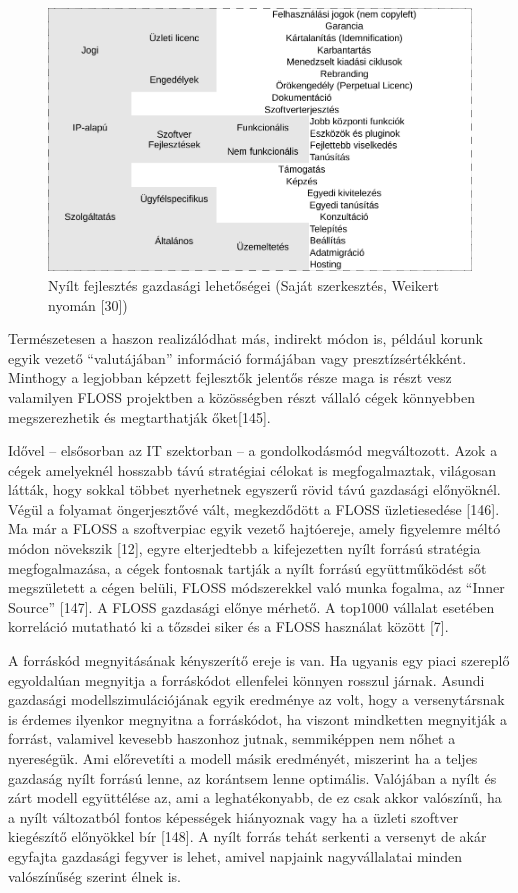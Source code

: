 \documentclass[12pt,magyar,a4paper,oneside]{scrreprt}
\begin{document}
\begin{figure}
\hypertarget{fig:uxdczletiModell}{%
\centering
\includegraphics{ábrák/FLOSS-üzleti-lehetőségek.pdf}
\caption{Nyílt fejlesztés gazdasági lehetőségei (Saját szerkesztés,
Weikert nyomán {[}30{]})}\label{fig:uxdczletiModell}
}
\end{figure}

Természetesen a haszon realizálódhat más, indirekt módon is, például
korunk egyik vezető ``valutájában'' információ formájában vagy
presztízsértékként. Minthogy a legjobban képzett fejlesztők jelentős
része maga is részt vesz valamilyen FLOSS projektben a közösségben részt
vállaló cégek könnyebben megszerezhetik és megtarthatják őket{[}145{]}.

Idővel -- elsősorban az IT szektorban -- a gondolkodásmód megváltozott.
Azok a cégek amelyeknél hosszabb távú stratégiai célokat is
megfogalmaztak, világosan látták, hogy sokkal többet nyerhetnek egyszerű
rövid távú gazdasági előnyöknél. Végül a folyamat öngerjesztővé vált,
megkezdődött a FLOSS üzletiesedése {[}146{]}. Ma már a FLOSS a
szoftverpiac egyik vezető hajtóereje, amely figyelemre méltó módon
növekszik {[}12{]}, egyre elterjedtebb a kifejezetten nyílt forrású
stratégia megfogalmazása, a cégek fontosnak tartják a nyílt forrású
együttműködést sőt megszületett a cégen belüli, FLOSS módszerekkel való
munka fogalma, az ``Inner Source'' {[}147{]}. A FLOSS gazdasági előnye
mérhető. A top1000 vállalat esetében korreláció mutatható ki a tőzsdei
siker és a FLOSS használat között {[}7{]}.

A forráskód megnyitásának kényszerítő ereje is van. Ha ugyanis egy piaci
szereplő egyoldalúan megnyitja a forráskódot ellenfelei könnyen rosszul
járnak. Asundi gazdasági modellszimulációjának egyik eredménye az volt,
hogy a versenytársnak is érdemes ilyenkor megnyitna a forráskódot, ha
viszont mindketten megnyitják a forrást, valamivel kevesebb haszonhoz
jutnak, semmiképpen nem nőhet a nyereségük. Ami előrevetíti a modell
másik eredményét, miszerint ha a teljes gazdaság nyílt forrású lenne, az
korántsem lenne optimális. Valójában a nyílt és zárt modell együttélése
az, ami a leghatékonyabb, de ez csak akkor valószínű, ha a nyílt
változatból fontos képességek hiányoznak vagy ha a üzleti szoftver
kiegészítő előnyökkel bír {[}148{]}. A nyílt forrás tehát serkenti a
versenyt de akár egyfajta gazdasági fegyver is lehet, amivel napjaink
nagyvállalatai minden valószínűség szerint élnek is.
\end{document}
